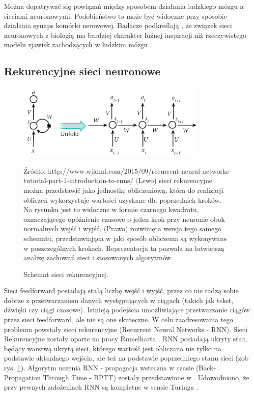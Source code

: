 \documentclass[oneside, mag]{mgr}
\begin{document}
Można dopatrywać się powiązań między sposobem działania ludzkiego mózgu a sieciami neuronowymi. Podobieństwo to może być widoczne przy sposobie działania synaps komórki nerowowej. Badacze podkreślają \cite{Goodfellow-et-al-2016}, że związek sieci neuronowych z biologią ma bardziej charakter luźnej inspiracji niż rzeczywistego modelu zjawisk zachodzących w ludzkim mózgu.

\subsection{Rekurencyjne sieci neuronowe}

\begin{figure}
	\centering
	\includegraphics[scale=1.0]{img/rnn.png}
	\caption{Schemat sieci rekurencyjnej.} Źródło: http://www.wildml.com/2015/09/recurrent-neural-networks-tutorial-part-1-introduction-to-rnns/ (Lewo) sieci rekurencyjne można przedstawić jako jednostkę obliczeniową, która do realizacji obliczeń wykorzystuje wartości uzyskane dla poprzednich kroków. Na rysunku jest to widoczne w formie czarnego kwadratu, oznaczającego opóźnienie czasowe o jeden krok przy neuronie obok normalnych wejść i wyjść. (Prawo) rozwinięta wersja tego samego schematu, przedstawiająca w jaki sposób obliczenia są wykonywane w poszczególnych krokach. Reprezentacja ta pozwala na łatwiejszą analizę zachowań sieci i stosowanych algorytmów. 
	\label{fig:rnn}
\end{figure}

Sieci feedforward posiadają stałą liczbę wejść i wyjść, przez co nie radzą sobie dobrze z przetwarzaniem danych występujących w ciągach (takich jak tekst, dźwięki czy ciągi czasowe). Istnieją podejścia umożliwiające przetwarzanie ciągów przez sieci feedforward, ale nie są one skuteczne. W celu zaadresowania tego problemu powstały sieci rekurencyjne (Recurrent Neural Networks - RNN).
Sieci Rekurencyjne zostały oparte na pracy Rumelharta \cite{RNN}. RNN posiadają ukryty stan, będący warstwą ukrytą sieci, którego wartość jest obliczana nie tylko na podstawie aktualnego wejścia, ale też na podstawie poprzedniego stanu sieci (zob rys. \ref{fig:rnn}).
Algorytm uczenia RNN - propagacja wsteczna w czasie (Back-Propagation Through Time - BPTT) zostały przedstawione w \cite{BPTT}.
Udowodniono, że przy pewnych założeniach RNN są kompletne w sensie Turinga \cite{turing-complete}.
\end{document}
